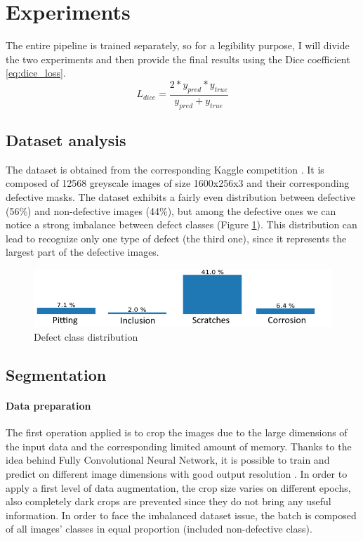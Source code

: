 \documentclass[10pt,twocolumn,letterpaper]{article}
\begin{document}
\section{Experiments}
   The entire pipeline is trained separately, so for a legibility purpose, I will divide the two experiments and then provide the final results using the Dice coefficient \eqref{eq:dice_loss}.
   \begin{equation}\label{eq:dice_loss}
      L_{dice} = \frac{2 * y_{pred} * y_{true}}{y_{pred} + y_{true}}
   \end{equation}

   \subsection{Dataset analysis}
   The dataset is obtained from the corresponding Kaggle competition \cite{Severstal}. It is composed of 12568 greyscale images of size 1600x256x3 and their corresponding defective masks.
   The dataset exhibits a fairly even distribution between defective (56\%) and non-defective images (44\%), but among the defective ones we can notice a strong imbalance between defect classes (Figure \ref{fig:classImbalance}). This distribution can lead to recognize only one type of defect (the third one), since it represents the largest part of the defective images.
   \begin{figure}[h]
      \centering
      \caption{Defect class distribution} \label{fig:classImbalance}
      \includegraphics[scale=0.45]{Img_ClassImbalance}
   \end{figure}

   \subsection{Segmentation}
      \paragraph{Data preparation}
         The first operation applied is to crop the images due to the large dimensions of the input data and the corresponding limited amount of memory. Thanks to the idea behind Fully Convolutional Neural Network, it is possible to train and predict on different image dimensions with good output resolution \cite{FCNN}.
         In order to apply a first level of data augmentation, the crop size varies on different epochs, also completely dark crops are prevented since they do not bring any useful information.
         In order to face the imbalanced dataset issue, the batch is composed of all images' classes in equal proportion (included non-defective class).
\end{document}
